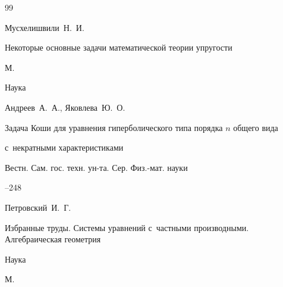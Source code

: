 \begin{thebibliography}{99}






\by Мусхелишвили~Н.~И.

\book Некоторые основные задачи математической теории упругости 

\publaddr М.

\publ Наука








\by Андреев~А.~А., Яковлева~Ю.~О. 

\paper Задача Коши для уравнения гиперболического типа порядка $n$ общего вида

с~некратными характеристиками

\jour Вестн. Сам. гос. техн. ун-та. Сер. Физ.-мат. науки




--248







\by Петровский~И.~Г.

\book Избранные труды. Системы уравнений с~частными производными. Алгебраическая геометрия


\publ Наука

\publaddr М.







\end{thebibliography}
